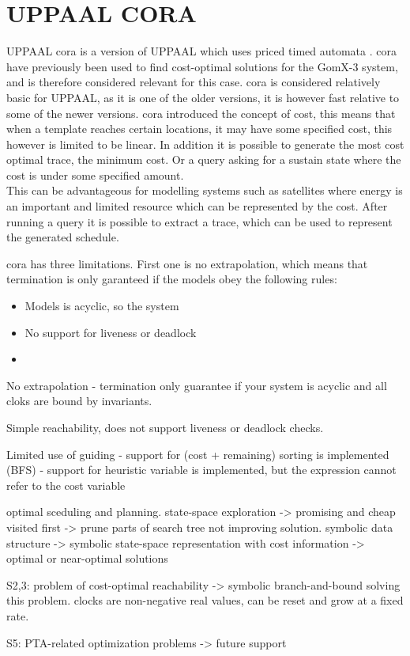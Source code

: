 \section{UPPAAL CORA}
UPPAAL \gls{cora} is a version of UPPAAL which uses priced timed automata \cite{cs_cora}. \Gls{cora} have previously been used to find cost-optimal solutions for the GomX-3 system\cite{gomx3}, and is therefore considered relevant for this case.
\Gls{cora} is considered relatively basic for UPPAAL, as it is one of the older versions, it is however fast relative to some of the newer versions. \Gls{cora} introduced the concept of cost, this means that when a template reaches certain locations, it may have some specified cost, this however is limited to be linear. In addition it is possible to generate the most cost optimal trace, the minimum cost. Or a query asking for a sustain state where the cost is under some specified amount.\\
This can be advantageous for modelling systems such as satellites where energy is an important and limited resource which can be represented by the cost. After running a query it is possible to extract a trace, which can be used to represent the generated schedule.

\gls{cora} has three limitations. First one is no extrapolation, which means that termination is only garanteed if the models obey the following rules: 
\begin{itemize}
	\item Models is acyclic, so the system
	\item No support for liveness or deadlock
	\item 
\end{itemize}


No extrapolation - termination only guarantee if your system is acyclic and all cloks are bound by invariants.

Simple reachability, does not support liveness or deadlock checks.

Limited use of guiding
- support for (cost + remaining) sorting is implemented (BFS)
- support for heuristic variable is implemented, but the expression cannot refer to the cost variable



optimal sceduling and planning.
state-space exploration -> promising and cheap visited first -> prune parts of search tree not improving solution.
symbolic data structure -> symbolic state-space representation with cost information -> optimal or near-optimal solutions

S2,3: problem of cost-optimal reachability -> symbolic branch-and-bound solving this problem.
 clocks are non-negative real values, can be reset and grow at a fixed rate.

S5: PTA-related optimization problems -> future support

